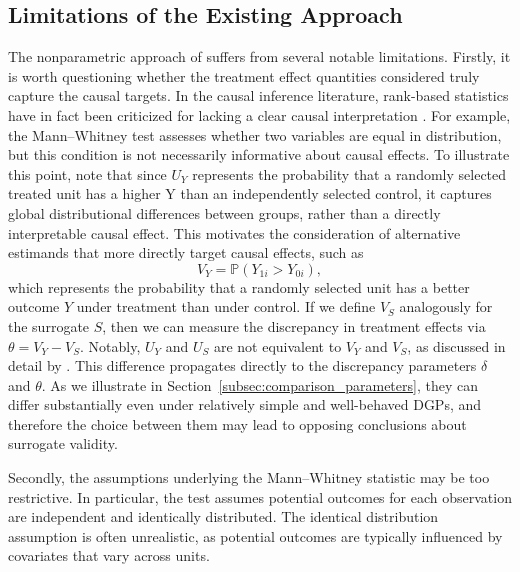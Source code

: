 \documentclass[referee,usenatbib]{biom}
\newcommand{\Prob}{\mathbb{P}}
\begin{document}
\subsection{Limitations of the Existing Approach}\label{subsec:limitations}

The nonparametric approach of \citet{parast2024rank} suffers from several notable limitations. Firstly, it is worth questioning whether the treatment effect quantities considered truly capture the causal targets. In the causal inference literature, rank-based statistics have in fact been criticized for lacking a clear causal interpretation \citep{imbens2015causal}. For example, the Mann--Whitney test assesses whether two variables are equal in distribution, but this condition is not necessarily informative about causal effects. To illustrate this point, note that since \(U_{Y}\) represents the probability that a randomly selected treated unit has a higher Y than an independently selected control, it captures global distributional differences between groups, rather than a directly interpretable causal effect. This motivates the consideration of alternative estimands that more directly target causal effects, such as
\begin{equation*}
  V_{Y} = \Prob(Y_{1i} > Y_{0i}),
\end{equation*}
which represents the probability that a randomly selected unit has a better outcome \(Y\) under treatment than under control. If we define \(V_{S}\) analogously for the surrogate \(S\), then we can measure the discrepancy in treatment effects via \(\theta = V_{Y} - V_{S}\). Notably, \(U_{Y}\) and \(U_{S}\) are not equivalent to \(V_{Y}\) and \(V_{S}\), as discussed in detail by \citet{fay2018causal}. This difference propagates directly to the discrepancy parameters \(\delta\) and \(\theta\). As we illustrate in Section~\ref{subsec:comparison_parameters}, they can differ substantially even under relatively simple and well-behaved DGPs, and therefore the choice between them may lead to opposing conclusions about surrogate validity.

Secondly, the assumptions underlying the Mann--Whitney statistic may be too restrictive. In particular, the test assumes potential outcomes for each observation are independent and identically distributed. The identical distribution assumption is often unrealistic, as potential outcomes are typically influenced by covariates that vary across units.
\end{document}
